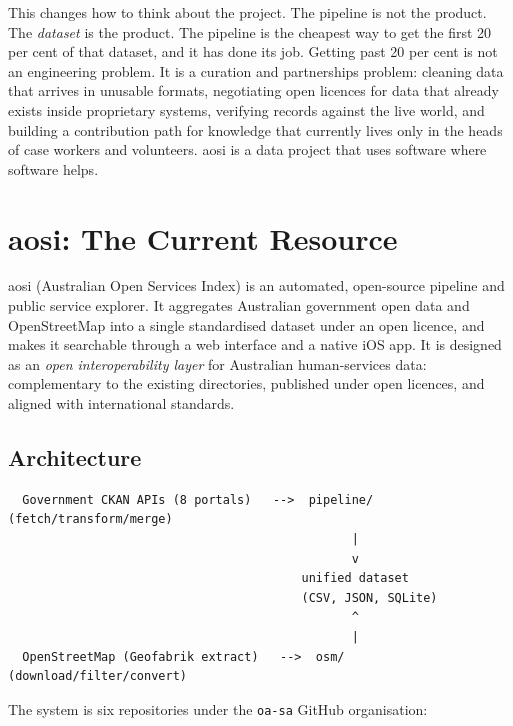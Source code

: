 \documentclass[11pt,a4paper]{article}
\begin{document}
This changes how to think about the project. The pipeline is not the product. The \emph{dataset} is the product. The pipeline is the cheapest way to get the first 20 per cent of that dataset, and it has done its job. Getting past 20 per cent is not an engineering problem. It is a curation and partnerships problem: cleaning data that arrives in unusable formats, negotiating open licences for data that already exists inside proprietary systems, verifying records against the live world, and building a contribution path for knowledge that currently lives only in the heads of case workers and volunteers. aosi is a data project that uses software where software helps.


\section{aosi: The Current Resource}

aosi (Australian Open Services Index) is an automated, open-source pipeline and public service explorer. It aggregates Australian government open data and OpenStreetMap into a single standardised dataset under an open licence, and makes it searchable through a web interface and a native iOS app. It is designed as an \emph{open interoperability layer} for Australian human-services data: complementary to the existing directories, published under open licences, and aligned with international standards.

\subsection{Architecture}

\begin{verbatim}
  Government CKAN APIs (8 portals)   -->  pipeline/ (fetch/transform/merge)
                                                |
                                                v
                                         unified dataset
                                         (CSV, JSON, SQLite)
                                                ^
                                                |
  OpenStreetMap (Geofabrik extract)   -->  osm/ (download/filter/convert)
\end{verbatim}

The system is six repositories under the \texttt{oa-sa} GitHub organisation:
\end{document}
